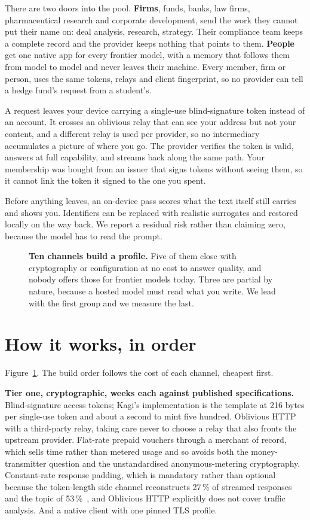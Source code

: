 \documentclass[9pt,twocolumn,a4paper]{extarticle}
\newcommand{\para}[1]{\vspace{3pt}\textbf{#1}\ }
\begin{document}
There are two doors into the pool. \textbf{Firms}, funds, banks, law firms, pharmaceutical research and corporate development, send the work they cannot put their name on: deal analysis, research, strategy. Their compliance team keeps a complete record and the provider keeps nothing that points to them. \textbf{People} get one native app for every frontier model, with a memory that follows them from model to model and never leaves their machine. Every member, firm or person, uses the same tokens, relays and client fingerprint, so no provider can tell a hedge fund's request from a student's.

A request leaves your device carrying a single-use blind-signature token instead of an account. It crosses an oblivious relay that can see your address but not your content, and a different relay is used per provider, so no intermediary accumulates a picture of where you go. The provider verifies the token is valid, answers at full capability, and streams back along the same path. Your membership was bought from an issuer that signs tokens without seeing them, so it cannot link the token it signed to the one you spent.

Before anything leaves, an on-device pass scores what the text itself still carries and shows you. Identifiers can be replaced with realistic surrogates and restored locally on the way back. We report a residual risk rather than claiming zero, because the model has to read the prompt.

\begin{figure}[t]
\centering
{}
\caption{\textbf{Ten channels build a profile.} Five of them close with cryptography or configuration at no cost to answer quality, and nobody offers those for frontier models today. Three are partial by nature, because a hosted model must read what you write. We lead with the first group and we measure the last.}
\label{fig:channels}
\end{figure}

\section{How it works, in order}
Figure~\ref{fig:channels}. The build order follows the cost of each channel, cheapest first.

\para{Tier one, cryptographic, weeks each against published specifications.} Blind-signature access tokens; Kagi's implementation is the template at 216 bytes per single-use token and about a second to mint five hundred. Oblivious HTTP with a third-party relay, taking care never to choose a relay that also fronts the upstream provider. Flat-rate prepaid vouchers through a merchant of record, which sells time rather than metered usage and so avoids both the money-transmitter question and the unstandardised anonymous-metering cryptography. Constant-rate response padding, which is mandatory rather than optional because the token-length side channel reconstructs 27\,\% of streamed responses and the topic of 53\,\%~\cite{weiss}, and Oblivious HTTP explicitly does not cover traffic analysis. And a native client with one pinned TLS profile.
\end{document}
